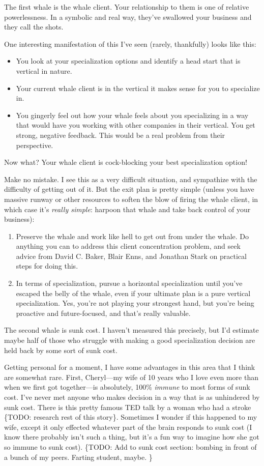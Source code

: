 The first whale is the whale client. Your relationship to them is one of relative powerlessness. In a symbolic and real way, they’ve swallowed your business and they call the shots.

One interesting manifestation of this I’ve seen (rarely, thankfully) looks like this:

\begin{itemize}
\item You look at your specialization options and identify a head start that is vertical in nature.
\item Your current whale client is in the vertical it makes sense for you to specialize in.
\item You gingerly feel out how your whale feels about you specializing in a way that would have you working with other companies in their vertical. You get strong, negative feedback. This would be a real problem from their perspective.
\end{itemize}

Now what? Your whale client is cock-blocking your best specialization option!

Make no mistake. I see this as a very difficult situation, and sympathize with the difficulty of getting out of it. But the exit plan is pretty simple (unless you have massive runway or other resources to soften the blow of firing the whale client, in which case it’s \emph{really simple}: harpoon that whale and take back control of your business):

\begin{enumerate}
\item Preserve the whale and work like hell to get out from under the whale. Do anything you can to address this client concentration problem, and seek advice from David C. Baker, Blair Enns, and Jonathan Stark on practical steps for doing this.
\item In terms of specialization, pursue a horizontal specialization until you've escaped the belly of the whale, even if your ultimate plan is a pure vertical specialization. Yes, you’re not playing your strongest hand, but you’re being proactive and future-focused, and that’s really valuable.
\end{enumerate}

The second whale is sunk cost. I haven’t measured this precisely, but I’d estimate maybe half of those who struggle with making a good specialization decision are held back by some sort of sunk cost.

Getting personal for a moment, I have some advantages in this area that I think are somewhat rare. First, Cheryl—my wife of 10 years who I love even more than when we first got together—is absolutely, 100\% \emph{immune} to most forms of sunk cost. I’ve never met anyone who makes decision in a way that is as unhindered by sunk cost. There is this pretty famous TED talk by a woman who had a stroke \{TODO: research rest of this story\}. Sometimes I wonder if this happened to my wife, except it only effected whatever part of the brain responds to sunk cost (I know there probably isn’t such a thing, but it’s a fun way to imagine how she got so immune to sunk cost). \{TODO: Add to sunk cost section: bombing in front of a bunch of my peers.  Farting student, maybe. \}

